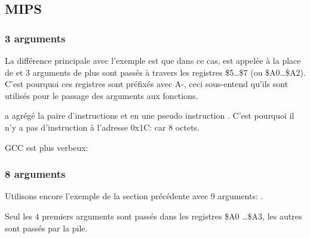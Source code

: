 \subsection{MIPS}

\subsubsection{3 arguments}


La différence principale avec l'exemple \q{\HelloWorldSectionName} est que dans ce cas, \printf est appelée
à la place de \puts et 3 arguments de plus sont passés à travers les registres \$5\dots \$7 (ou \$A0\dots \$A2).
C'est pourquoi ces registres sont préfixés avec A-, ceci sous-entend qu'ils
sont utilisés pour le passage des arguments aux fonctions.





\IDA a agrégé la paire d'instructions  et  en une pseudo instruction .
C'est pourquoi il n'y a pas d'instruction à l'adresse 0x1C: car   8 octets.


GCC \NonOptimizing est plus verbeux:





\subsubsection{8 arguments}

Utilisons encore l'exemple de la section précédente avec 9 arguments: .




Seul les 4 premiers arguments sont passés dans les registres \$A0 \dots \$A3,
les autres sont passés par la pile.

